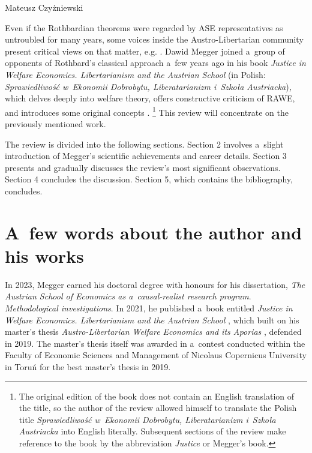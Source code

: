 \begin{newrevengenv}{Mateusz Czyżniewski}
\begin{enumerate}
\end{enumerate}

Even if the Rothbardian theorems were regarded by ASE representatives as untroubled for many years, some voices inside the Austro-Libertarian community present critical views on that matter, e.g. 
\parencites[][]{prychitko_formalism_1993}[][]{gunning_did_2005}[][]{kvasnicka_rothbards_2008}[][]{wysocki_how_2023}[][]{wysocki_how_2023}. %
 Dawid Megger joined a~group of opponents of Rothbard's classical approach a~few years ago in his book \textit{Justice in Welfare Economics. Libertarianism and the Austrian School} (in Polish: \textit{Sprawiedliwość w~Ekonomii Dobrobytu, Liberatarianizm i~Szkoła Austriacka})\textit{,} which delves deeply into welfare theory, offers constructive criticism of RAWE, and introduces some original concepts 
\parencite[][]{megger_sprawiedliwosc_2021}.%
\footnote{The original edition of the book does not contain an English translation of the title, so the author of the review allowed himself to translate the Polish title \textit{Sprawiedliwość w~Ekonomii Dobrobytu, Liberatarianizm i~Szkoła Austriacka} into English literally. Subsequent sections of the review make reference to the book by the abbreviation \textit{Justice} or Megger's book.} This review will concentrate on the previously mentioned work.



The review is divided into the following sections. Section 2 involves a~slight introduction of Megger's scientific achievements and career details. Section 3 presents and gradually discusses the review's most significant observations. Section 4 concludes the discussion. Section 5, which contains the bibliography, concludes.



\section{A~few words about the author and his works}

In 2023, Megger earned his doctoral degree with honours for his dissertation, \textit{The Austrian School of Economics as a~causal-realist research program}. \textit{Methodological investigations}. In 2021, he published a~book entitled \textit{Justice in Welfare Economics. Libertarianism and the Austrian School} 
\parencite[][]{megger_sprawiedliwosc_2021}, %
 which built on his master's thesis \textit{Austro-Libertarian Welfare Economics and its Aporias} 
\parencite[][]{megger_austriacka_2023}, %
 defended in 2019. The master's thesis itself was awarded in a~contest conducted within the Faculty of Economic Sciences and Management of Nicolaus Copernicus University in Toruń for the best master's thesis in 2019.




\end{newrevengenv}

